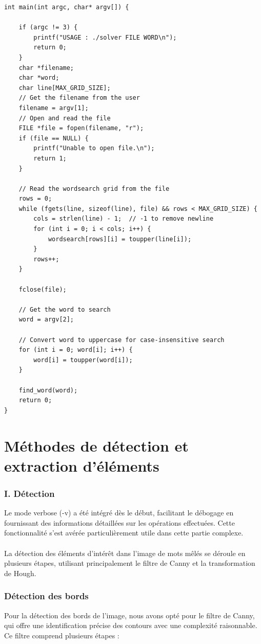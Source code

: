 \begin{lstlisting}[style=CStyle]
int main(int argc, char* argv[]) {

	if (argc != 3) {
		printf("USAGE : ./solver FILE WORD\n");
		return 0;
	}
	char *filename;
	char *word;
	char line[MAX_GRID_SIZE];
	// Get the filename from the user
	filename = argv[1];
	// Open and read the file
	FILE *file = fopen(filename, "r");
	if (file == NULL) {
		printf("Unable to open file.\n");
		return 1;
	}

	// Read the wordsearch grid from the file
	rows = 0;
	while (fgets(line, sizeof(line), file) && rows < MAX_GRID_SIZE) {
		cols = strlen(line) - 1;  // -1 to remove newline
		for (int i = 0; i < cols; i++) {
			wordsearch[rows][i] = toupper(line[i]);
		}
		rows++;
	}

	fclose(file);

	// Get the word to search
	word = argv[2];

	// Convert word to uppercase for case-insensitive search
	for (int i = 0; word[i]; i++) {
		word[i] = toupper(word[i]);
	}

	find_word(word);
	return 0;
}
\end{lstlisting}

\chapter{Méthodes de détection et extraction d'éléments}

\subsection{I. Détection}

Le mode verbose (-v) a été intégré dès le début, facilitant le débogage en fournissant des informations détaillées sur les opérations effectuées. Cette fonctionnalité s'est avérée particulièrement utile dans cette partie complexe.\\\\
La détection des éléments d'intérêt dans l'image de mots mêlés se déroule en plusieurs étapes, utilisant principalement le filtre de Canny et la transformation de Hough.

\subsection{Détection des bords}

Pour la détection des bords de l'image, nous avons opté pour le filtre de Canny, qui offre une identification précise des contours avec une complexité raisonnable. Ce filtre comprend plusieurs étapes :

